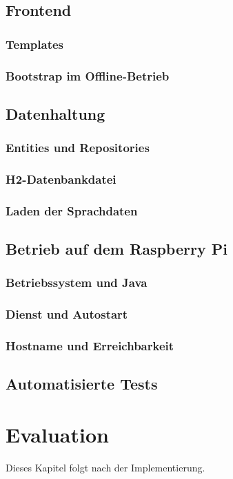 \documentclass[12pt,a4paper]{scrreprt}
\begin{document}
\section{Frontend}
\subsection{Templates}
\subsection{Bootstrap im Offline-Betrieb}
\section{Datenhaltung}
\subsection{Entities und Repositories}
\subsection{H2-Datenbankdatei}
\subsection{Laden der Sprachdaten}
\section{Betrieb auf dem Raspberry Pi}
\subsection{Betriebssystem und Java}
\subsection{Dienst und Autostart}
\subsection{Hostname und Erreichbarkeit}
\section{Automatisierte Tests}

\chapter{Evaluation}
Dieses Kapitel folgt nach der Implementierung.
\end{document}
